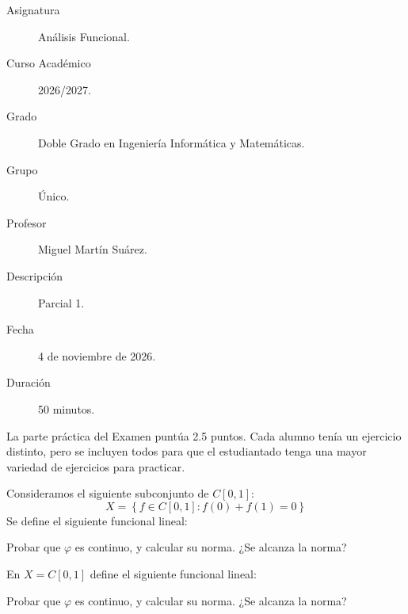 \documentclass[12pt]{article}
\begin{document}

    
    

    \begin{description}
        \item[Asignatura] Análisis Funcional.
        \item[Curso Académico] 2026/2027.
        \item[Grado] Doble Grado en Ingeniería Informática y Matemáticas.
        \item[Grupo] Único.
        \item[Profesor] Miguel Martín Suárez.
        \item[Descripción] Parcial 1.
        \item[Fecha] 4 de noviembre de 2026.
        \item[Duración] 50 minutos.
    
    \end{description}
    \newpage



La parte práctica del Examen puntúa 2.5 puntos. Cada alumno tenía un ejercicio distinto, pero se incluyen todos para que el estudiantado tenga una mayor variedad de ejercicios para practicar.
\begin{ejercicio}[2.5 puntos]
    Consideramos el siguiente subconjunto de $C[0,1]$:
    \begin{equation*}
        X=\left\{f \in C[0,1] : f(0) + f(1) = 0\right\}
    \end{equation*}
    Se define el siguiente funcional lineal:

    Probar que $\varphi$ es continuo, y calcular su norma. ¿Se alcanza la norma?
\end{ejercicio}

\begin{ejercicio}[2.5 puntos]
    En $X=C[0,1]$ define el siguiente funcional lineal:

    Probar que $\varphi$ es continuo, y calcular su norma. ¿Se alcanza la norma?
\end{ejercicio}
\end{document}

